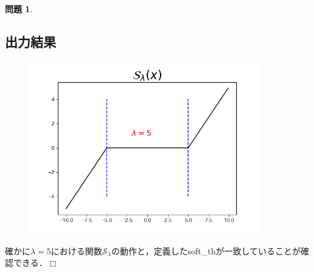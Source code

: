 \documentclass[titlepage]{jsarticle}
\theoremstyle{definition}
\newtheorem{Ex}{問題}
\theoremstyle{mystyle} %
\def\qed{\hfill$\Box$}
\begin{document}
\begin{Ex}
\begin{enumerate}[(a)]
\subsection*{出力結果}
\begin{figure}[H]
\includegraphics[width=10cm]{sl.png}
\end{figure}
確かに$\lambda=5$における関数$\mathcal{S}_{\lambda}$の動作と，定義したsoft\_thが一致していることが確認できる．\qed\\
\end{enumerate}
\end{Ex}
\end{document}
